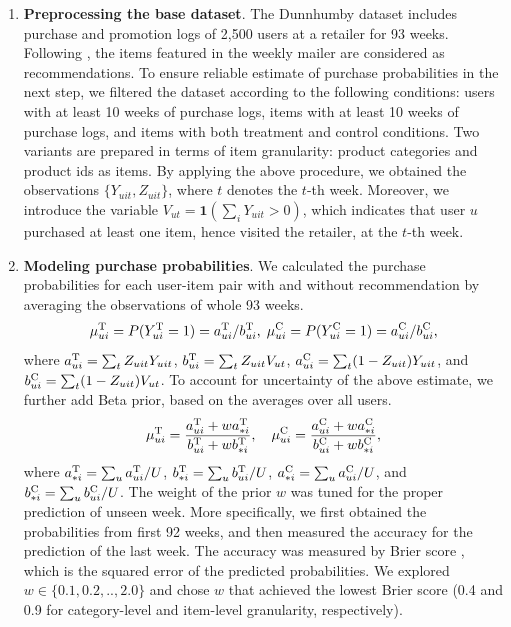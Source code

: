 \documentclass[manuscript,screen]{acmart}
\begin{document}
\begin{enumerate}
	\item \textbf{Preprocessing the base dataset}.
	The Dunnhumby dataset includes purchase and promotion logs of 2,500 users at a retailer for 93 weeks.
	Following \cite{Sato19}, the items featured in the weekly mailer are considered as recommendations.
	To ensure reliable estimate of purchase probabilities in the next step, we filtered the dataset according to the following conditions: users with at least 10 weeks of purchase logs, items with at least 10 weeks of purchase logs, and items with both treatment and control conditions.
	Two variants are prepared in terms of item granularity: product categories and product ids as items. 
	By applying the above procedure, we obtained the observations $\{Y_{uit}, Z_{uit}\}$, where $t$ denotes the $t$-th week.
	Moreover, we introduce the variable $V_{ut} = \boldsymbol{1}( \sum_i Y_{uit} > 0)$, which indicates that user $u$ purchased at least one item, hence visited the retailer, at the $t$-th week.

	\item \textbf{Modeling purchase probabilities}.
	We calculated the purchase probabilities for each user-item pair with and without recommendation by averaging the observations of whole 93 weeks. 
	\begin{equation}
	\mu_{ui}^\textnormal{T} = P(Y_{ui}^\textnormal{T}=1) = a_{ui}^\textnormal{T}/b_{ui}^\textnormal{T},\; %
	\mu_{ui}^\textnormal{C} = P(Y_{ui}^\textnormal{C}=1) = a_{ui}^\textnormal{C}/b_{ui}^\textnormal{C},
	\end{equation}
	where $a_{ui}^\textnormal{T}=\sum_t Z_{uit} Y_{uit}$, $b_{ui}^\textnormal{T}=\sum_t Z_{uit} V_{ut}$, $a_{ui}^\textnormal{C}=\sum_t (1-Z_{uit}) Y_{uit}$, and $b_{ui}^\textnormal{C}=\sum_t (1-Z_{uit})V_{ut}$.
	To account for uncertainty of the above estimate, we further add Beta prior, based on the averages over all users.
	\begin{equation}
	\mu_{ui}^\textnormal{T} = \frac{a_{ui}^\textnormal{T} + w a_{*i}^\textnormal{T}}{b_{ui}^\textnormal{T} + w b_{*i}^\textnormal{T}}, \quad  \mu_{ui}^\textnormal{C} = \frac{a_{ui}^\textnormal{C} + w a_{*i}^\textnormal{C}}{b_{ui}^\textnormal{C} + w b_{*i}^\textnormal{C}},
	\end{equation}
	where $a_{*i}^\textnormal{T}=\sum_u a_{ui}^\textnormal{T}/U$, $b_{*i}^\textnormal{T}=\sum_u b_{ui}^\textnormal{T}/U$, $a_{*i}^\textnormal{C}=\sum_u a_{ui}^\textnormal{C}/U$, and $b_{*i}^\textnormal{C}=\sum_u b_{ui}^\textnormal{C}/U$.
	The weight of the prior $w$ was tuned for the proper prediction of unseen week.
	More specifically, we first obtained the probabilities from first 92 weeks, and then measured the accuracy for the prediction of the last week.
	The accuracy was measured by Brier score \cite{Brier50, Snoek19}, which is the squared error of the predicted probabilities.
	We explored $w \in \{0.1, 0.2, .., 2.0\}$ and chose $w$ that achieved the lowest Brier score (0.4 and 0.9 for category-level and item-level granularity, respectively).


\end{enumerate}
\end{document}
